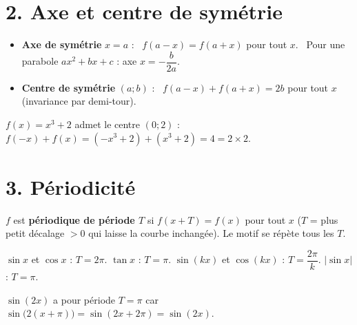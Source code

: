 \documentclass[11pt,a4paper]{article}
\begin{document}
\section*{2. Axe et centre de symétrie}

\begin{idee}
\begin{itemize}[leftmargin=1.5em,topsep=2pt]
  \item \textbf{Axe de symétrie} $x=a$ : \ $f(a-x)=f(a+x)$ pour tout $x$. \ Pour une parabole $ax^2+bx+c$ : axe $x=-\dfrac{b}{2a}$.
  \item \textbf{Centre de symétrie} $(a;b)$ : \ $f(a-x)+f(a+x)=2b$ pour tout $x$ (invariance par demi-tour).
\end{itemize}
\end{idee}

\begin{exemple}
$f(x)=x^3+2$ admet le centre $(0;2)$ : $f(-x)+f(x)=(-x^3+2)+(x^3+2)=4=2\times 2$. \checkmark
\end{exemple}

\section*{3. Périodicité}

$f$ est \textbf{périodique de période $T$} si $f(x+T)=f(x)$ pour tout $x$ ($T$ = plus petit décalage $>0$ qui laisse la courbe inchangée). Le motif se répète tous les $T$.

\begin{idee}
$\sin x$ et $\cos x$ : $T=2\pi$. \quad $\tan x$ : $T=\pi$. \quad $\sin(kx)$ et $\cos(kx)$ : $T=\dfrac{2\pi}{k}$. \quad $|\sin x|$ : $T=\pi$.
\end{idee}

\begin{exemple}
$\sin(2x)$ a pour période $T=\pi$ car $\sin\!\big(2(x+\pi)\big)=\sin(2x+2\pi)=\sin(2x)$.
\end{exemple}
\end{document}
